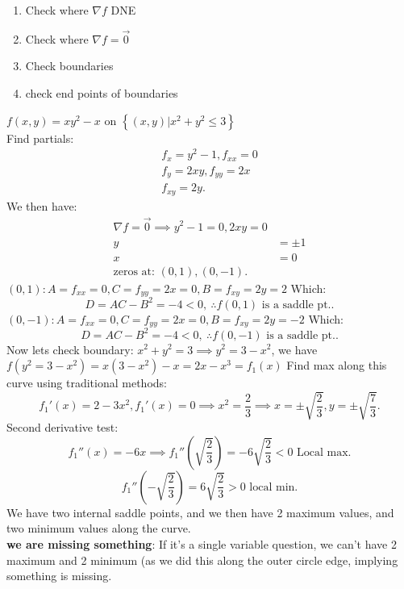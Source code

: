 \begin{itemize}
\begin{idea}
			\begin{enumerate}
				\item Check where $\nabla f$ DNE\\
		\item Check where $\nabla f= \vec{0}$\\
		\item Check boundaries\\
		\item check end points of boundaries
			\end{enumerate}
		\end{idea}
		\begin{example}
			$f\left( x,y \right)  = xy^2 - x$ on $\left\{ \left( x,y \right) | x^2 + y^2 \le  3 \right\} $ \\
			Find partials:
			\begin{align*}
				f_x = y^2-1, f_{xx} = 0\\
				f_y = 2xy, f_{yy} = 2x\\
				f_{xy} = 2y
			.\end{align*}
			We then have:
			\begin{align*}
				\nabla f = \vec{0} \implies y^2 - 1 = 0, 2xy = 0\\
				y &= \pm 1 \\
				x&= 0 \\
				\text{zeros at: } \left( 0,1 \right) , \left(  0,-1\right) 			
			.\end{align*}
			$\left( 0,1 \right): A= f_{xx} = 0, C = f_{yy} = 2x = 0, B = f_{xy} = 2y = 2$ Which:
			\[
			D = AC-B^2 = -4 < 0,~ \therefore f(0,1)\text{ is a saddle pt.}
			.\] 
			$\left( 0,-1 \right): A= f_{xx} = 0, C = f_{yy} = 2x = 0, B = f_{xy} = 2y = -2$ Which:
			\[
			D = AC-B^2 = -4 < 0,~ \therefore f(0,-1)\text{ is a saddle pt.}
			.\] 
			Now lets check boundary:
			$x^2 + y^2 = 3 \implies y^2 = 3 - x^2$, we have $f\left( y^2 = 3-x^2 \right)  = x\left( 3-x^2 \right) -x = 2x-x^3 = f_1(x)$ 
			Find max along this curve using traditional methods:
			\[
			f_1'(x) = 2-3x^2, f_1'(x) = 0 \implies x^2 = \frac{2}{3} \implies x = \pm \sqrt{\frac{2}{3}}, y = \pm \sqrt{\frac{7}{3}} 
			.\] 
			Second derivative test:
			\[
			f_1''(x) = -6x \implies f_1''\left(\sqrt{\frac{2}{3}}\right) = -6\sqrt{\frac{2}{3}}  < 0 \text{ Local max}
			.\] 
			\[
			f_1''\left( -\sqrt{\frac{2}{3}}  \right)  = 6\sqrt{\frac{2}{3}} > 0 \text{ local min} 
			.\] 
We have two internal saddle points, and we then have 2 maximum values, and two minimum values along the curve.\\
\textbf{we are missing something}: If it's a single variable question, we can't have 2 maximum and 2 minimum (as we did this along the outer circle edge, implying something is missing. \\

\end{example}
\end{itemize}
